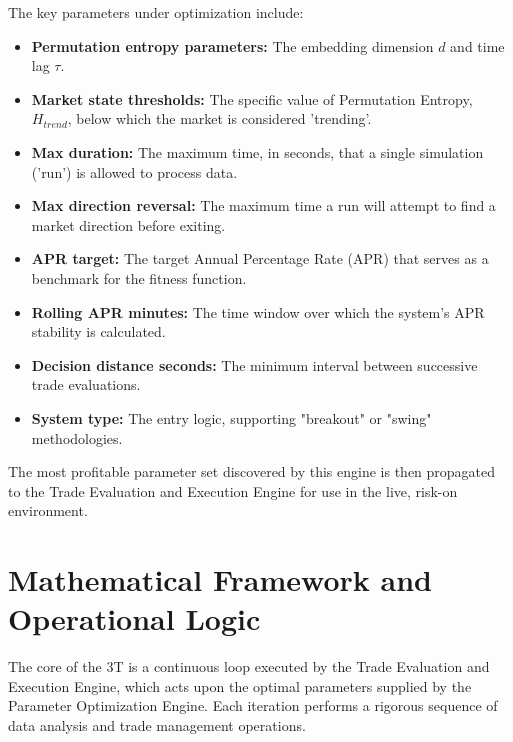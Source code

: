 \documentclass[10pt]{article}
\begin{document}
The key parameters under optimization include:
\begin{itemize}
    \item \textbf{Permutation entropy parameters:} The embedding dimension $d$ and time lag $\tau$.
    \item \textbf{Market state thresholds:} The specific value of Permutation Entropy, $H_{trend}$, below which the market is considered 'trending'.
    \item \textbf{Max duration:} The maximum time, in seconds, that a single simulation ('run') is allowed to process data.
    \item \textbf{Max direction reversal:} The maximum time a run will attempt to find a market direction before exiting.
    \item \textbf{APR target:} The target Annual Percentage Rate (APR) that serves as a benchmark for the fitness function.
    \item \textbf{Rolling APR minutes:} The time window over which the system's APR stability is calculated.
    \item \textbf{Decision distance seconds:} The minimum interval between successive trade evaluations.
    \item \textbf{System type:} The entry logic, supporting "breakout" or "swing" methodologies.
\end{itemize}
The most profitable parameter set discovered by this engine is then propagated to the Trade Evaluation and Execution Engine for use in the live, risk-on environment.

\section{Mathematical Framework and Operational Logic}
The core of the 3T is a continuous loop executed by the Trade Evaluation and Execution Engine, which acts upon the optimal parameters supplied by the Parameter Optimization Engine. Each iteration performs a rigorous sequence of data analysis and trade management operations.
\end{document}
